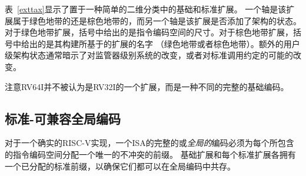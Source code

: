表~\ref{exttax}显示了置于一种简单的二维分类中的基础和标准扩展。
一个轴是该扩展属于绿色地带的还是棕色地带的，而另一个轴是该扩展是否添加了架构的状态。
对于绿色地带扩展，括号中给出的是指令编码空间的尺寸。对于棕色地带扩展，括号中给出的是其构建所基于的扩展的名字
（绿色地带或者棕色地带）。额外的用户级架构状态通常暗示了对监管器级别系统的改变，或者对标准调用约定的可能的改变。

注意RV64I并不被认为是RV32I的一个扩展，而是一种不同的完整的基础编码。

\vspace{-0.2in}
\subsection*{标准-可兼容全局编码}

对于一个确实的RISC-V实现，一个ISA的完整的或{\em 全局的}编码必须为每个所包含的指令编码空间分配一个唯一的不冲突的前缀。
基础扩展和每个标准扩展各拥有一个已分配的标准前缀，以确保它们都可以在全局编码中共存。

